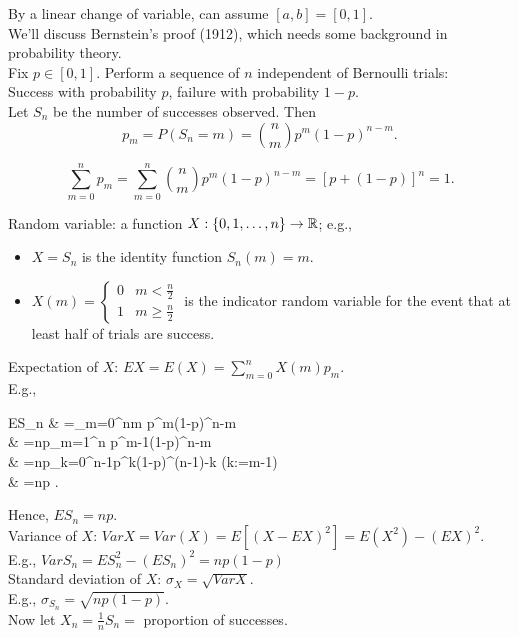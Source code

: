 \begin{exercise}
	By a linear change of variable, can assume $[a,b]=[0,1]$.\\
	We'll discuss Bernstein's proof (1912), which needs some background in probability theory.\\
	Fix $p \in [0,1]$. Perform a sequence of $n$ independent of Bernoulli trials:\\
	Success with probability $p$, failure with probability $1-p$.\\
	Let $S_{n}$ be the number of successes observed. Then
	\[
		p_{m}=P(S_{n}=m)= \binom{n}{m} p^{m}(1-p)^{n-m}
		.\]
	\begin{note}
		\[
			\sum_{m=0}^{n}{p_{m}}=\sum_{m=0}^{n}{\binom{n}{m}p^{m}(1-p)^{n-m}}=[p+(1-p)]^{n}=1
			.\]
	\end{note}
	Random variable: a function $X: \{0,1,\ldots ,n\}\to \mathbb{R}$; e.g.,
	\begin{itemize}
		\item $X=S_{n}$ is the identity function $S_{n}(m)=m$. \\
		\item $X(m)= \begin{cases}
				      0 & m<\frac{n}{2}    \\
				      1 & m\ge \frac{n}{2}
			      \end{cases}$ is the indicator random variable for the event that at least half of trials are success.
	\end{itemize}
	Expectation of $X$: $EX=E(X)=\sum_{m=0}^{n}{X(m)p_{m}}$.\\
	E.g.,
	\begin{flalign*}
		ES_n & =\sum_{m=0}^{n}{m p^{m}(1-p)^{n-m}}                                 \\
		     & =np\sum_{m=1}^{n}{ p^{m-1}(1-p)^{n-m}}               \\
		     & =np\sum_{k=0}^{n-1}{p^{k}(1-p)^{(n-1)-k}}           \;\; (k:=m-1) \\
		     & =np
		.\end{flalign*}
	Hence, $ES_n=np$.\\
	Variance of $X$: $VarX=Var(X)=E[(X-EX)^2]=E(X^{2})-(EX)^{2}$.\\
	E.g., $VarS_n=E{S_n^{2}}-(ES_n)^{2}=np(1-p)$\\
	Standard deviation of $X$: $\sigma_{X}=\sqrt{VarX}$.\\
	E.g., $\sigma_{S_n}=\sqrt{np(1-p)}$.\\
	Now let $X_{n}=\frac{1}{n}S_n=$ proportion of successes.\\

\end{exercise}
